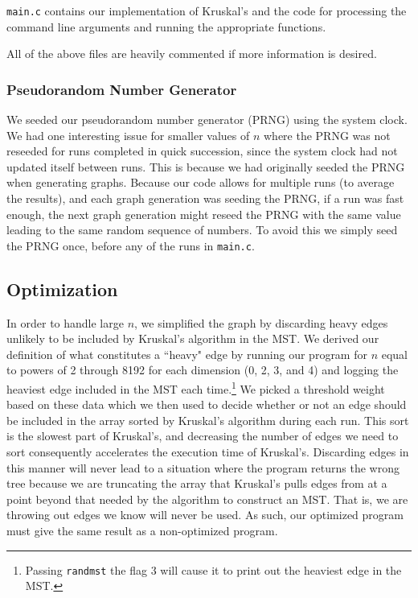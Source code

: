 \documentclass[solution, letterpaper]{cs121}
\begin{document}
\texttt{main.c} contains our implementation of Kruskal's and the code for processing the command line arguments and running the appropriate functions.

All of the above files are heavily commented if more information is desired.

\subsubsection*{Pseudorandom Number Generator}
We seeded our pseudorandom number generator (PRNG) using the system clock. We had one interesting issue for smaller values of $n$ where the PRNG was not reseeded for runs completed in quick succession, since the system clock had not updated itself between runs. This is because we had originally seeded the PRNG when generating graphs. Because our code allows for multiple runs (to average the results), and each graph generation was seeding the PRNG, if a run was fast enough, the next graph generation might reseed the PRNG with the same value leading to the same random sequence of numbers. To avoid this we simply seed the PRNG once, before any of the runs in \texttt{main.c}.

\subsection*{Optimization}
In order to handle large $n$, we simplified the graph by discarding heavy edges unlikely to be included by Kruskal's algorithm in the MST. We derived our definition of what constitutes a 	``heavy" edge by running our program for $n$ equal to powers of 2 through 8192 for each dimension (0, 2, 3, and 4) and logging the heaviest edge included in the MST each time.\footnote{Passing {\tt randmst} the flag 3 will cause it to print out the heaviest edge in the MST.} We picked a threshold weight based on these data which we then used to decide whether or not an edge should be included in the array sorted by Kruskal's algorithm during each run. This sort is the slowest part of Kruskal's, and decreasing the number of edges we need to sort consequently accelerates the execution time of Kruskal's. Discarding edges in this manner will never lead to a situation where the program returns the wrong tree because we are truncating the array that Kruskal's pulls edges from at a point beyond that needed by the algorithm to construct an MST. That is, we are throwing out edges we know will never be used. As such, our optimized program must give the same result as a non-optimized program.
\end{document}
